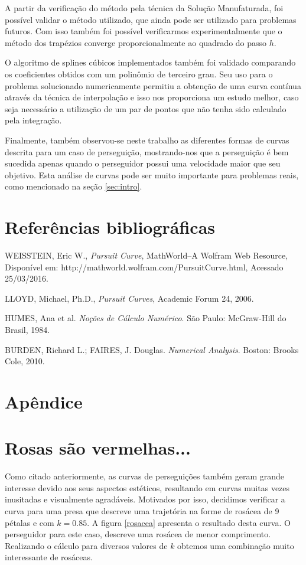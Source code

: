 \documentclass[a4paper,10pt]{article}
\begin{document}
  A partir da verificação do método pela técnica da Solução Manufaturada, foi possível validar o método utilizado, que ainda pode ser utilizado para problemas futuros. Com isso também foi possível verificarmos experimentalmente que o método dos trapézios converge proporcionalmente ao quadrado do passo $h$.
  
  O algoritmo de splines cúbicos implementados também foi validado comparando os coeficientes obtidos com um polinômio de terceiro grau. Seu uso para o problema solucionado numericamente permitiu a obtenção de uma curva contínua através da técnica de interpolação e isso nos proporciona um estudo melhor, caso seja necessário a utilização de um par de pontos que não tenha sido calculado pela integração.
  
  Finalmente, também observou-se neste trabalho as diferentes formas de curvas descrita para um caso de perseguição, mostrando-nos que a perseguição é bem sucedida apenas quando o perseguidor possui uma velocidade maior que seu objetivo. Esta análise de curvas pode ser muito importante para problemas reais, como mencionado na seção \ref{sec:intro}.
  
  \section{Referências bibliográficas}
  

  \begin{thebibliography}{9}
      WEISSTEIN, Eric W.,
      \emph{Pursuit Curve},
      MathWorld--A Wolfram Web Resource,
      Disponível em: http://mathworld.wolfram.com/PursuitCurve.html,
      Acessado 25/03/2016.

      LLOYD, Michael, Ph.D.,
      \emph{Pursuit Curves},
      Academic Forum 24,
      2006.
      
      HUMES, Ana et al. \emph{Noções de Cálculo Numérico}. São Paulo: McGraw-Hill do Brasil, 1984.
     
      BURDEN, Richard L.; FAIRES, J. Douglas. \emph{Numerical Analysis}. Boston: Brooks Cole, 2010.  

  \end{thebibliography}
  
  \newpage
  \section{Apêndice}
  \appendix
  \section{Rosas são vermelhas...}
  Como citado anteriormente, as curvas de perseguições também geram grande interesse devido aos seus aspectos estéticos, resultando em curvas muitas vezes inusitadas e visualmente agradáveis.
  Motivados por isso, decidimos verificar a curva para uma presa que descreve uma trajetória na forme de rosácea de 9 pétalas e com $k = 0.85$. A figura \ref{rosacea} apresenta o resultado desta curva. O perseguidor para este caso, descreve uma rosácea de menor comprimento. Realizando o cálculo para diversos valores de $k$ obtemos uma combinação muito interessante de rosáceas.
  
\end{document}

